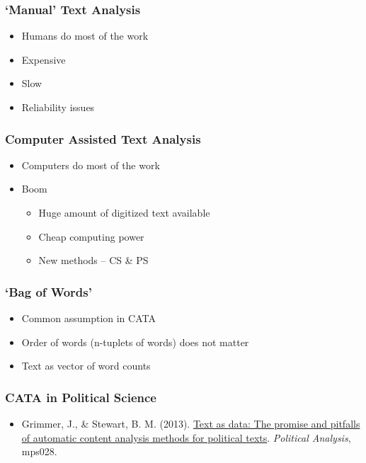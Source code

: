 \documentclass[20pt]{beamer}
\begin{document}
\begin{frame}
	\frametitle{`Manual' Text Analysis}
	\begin{itemize}
		\item 	Humans do most of the work
		\item 	Expensive
        \item   Slow
        \item   Reliability issues 
	\end{itemize}
\end{frame}


\begin{frame}
	\frametitle{Computer Assisted Text Analysis}
	\begin{itemize}
		\item 	Computers do most of the work
		\item   Boom 
	    \begin{itemize}
		    \item 	Huge amount of digitized text available
            \item    Cheap computing power
            \item   New methods -- CS \& PS
     	\end{itemize}    
	\end{itemize}
\end{frame}


\begin{frame}
	\frametitle{`Bag of Words'}
	\begin{itemize}
		\item 	Common assumption in CATA
		\item 	Order of words (n-tuplets of words) does not matter
		\item 	Text as vector of word counts
	\end{itemize}
\end{frame}


\begin{frame}
	\frametitle{CATA in Political Science}
	\begin{itemize}
		\item Grimmer, J., \& Stewart, B. M. (2013). \href{http://pan.oxfordjournals.org/content/21/3/267}{Text as data: The promise and pitfalls of automatic content analysis methods for political texts}. {\it Political Analysis}, mps028.	
	\end{itemize}
\end{frame}
\end{document}
